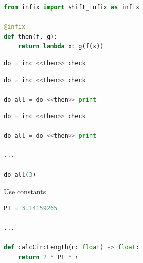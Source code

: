 \documentclass[aspectratio=169]{beamer}
\begin{document}
\begin{frame}[fragile]
    \begin{figure}[!h]
        \centering
    \end{figure}
\end{frame}

\begin{frame}[fragile,t]
    \begin{lstlisting}[language=Python]
from infix import shift_infix as infix

@infix
def then(f, g):
    return lambda x: g(f(x))
    \end{lstlisting}
\end{frame}

\begin{frame}[fragile,t]
    \begin{lstlisting}[language=Python]
do = inc <<then>> check
    \end{lstlisting}
\end{frame}

\begin{frame}[fragile,t]
    \begin{lstlisting}[language=Python]
do = inc <<then>> check

do_all = do <<then>> print
    \end{lstlisting}
\end{frame}

\begin{frame}[fragile,t]
    \begin{lstlisting}[language=Python]
do = inc <<then>> check

do_all = do <<then>> print

...

do_all(3)
    \end{lstlisting}
\end{frame}

\begin{frame}
    \centering
        \Huge{Use  constants}
\end{frame}

\begin{frame}[fragile,t]
    \begin{lstlisting}[language=Python]
PI = 3.14159265

...

def calcCircLength(r: float) -> float:
    return 2 * PI * r
    \end{lstlisting}
\end{frame}
\end{document}
